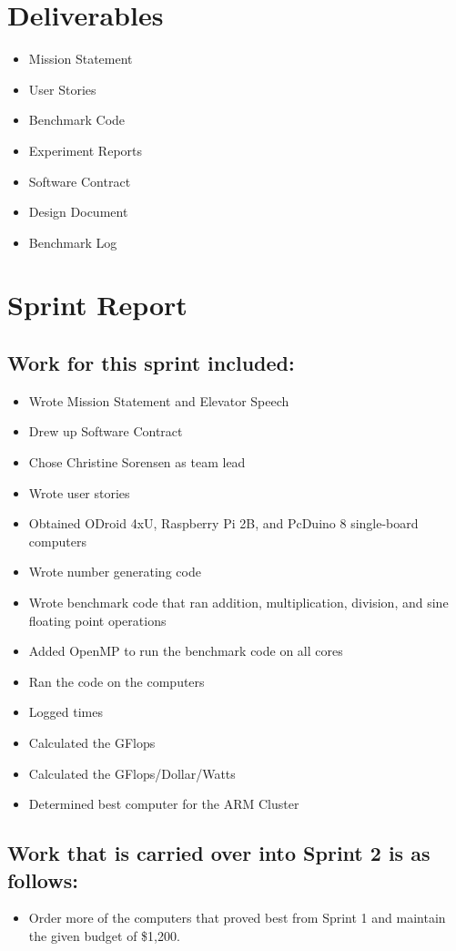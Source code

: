 \documentclass{article}
\begin{document}
\section*{Deliverables}
\begin{itemize}
	\item Mission Statement
	\item User Stories
	\item Benchmark Code
	\item Experiment Reports
	\item Software Contract
	\item Design Document
	\item Benchmark Log
\end{itemize}

\section*{Sprint Report}
\subsection*{Work for this sprint included:}
\begin{itemize}
	\item Wrote Mission Statement and Elevator Speech
	\item Drew up Software Contract
	\item Chose Christine Sorensen as team lead
	\item Wrote user stories
	\item Obtained ODroid 4xU, Raspberry Pi 2B, and PcDuino 8 single-board computers
	\item Wrote number generating code
	\item Wrote benchmark code that ran addition, multiplication, division, and sine floating point operations
	\item Added OpenMP to run the benchmark code on all cores
	\item Ran the code on the computers
	\item Logged times
	\item Calculated the GFlops
	\item Calculated the GFlops/Dollar/Watts
	\item Determined best computer for the ARM Cluster
\end{itemize}
\subsection*{Work that is carried over into Sprint 2 is as follows:}
\begin{itemize}
	\item Order more of the computers that proved best from Sprint 1 and maintain the given budget of \$1,200.
\end{itemize}
\end{document}
